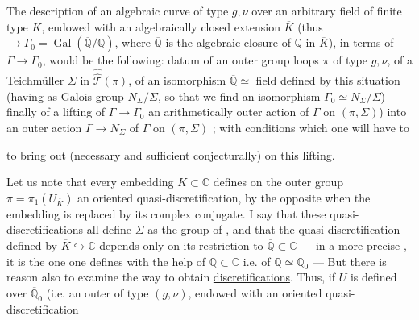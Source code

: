 The description of an  algebraic curve of type $g,\nu$ over an arbitrary  field of finite type  $K$, endowed with an algebraically closed extension $\overline K$ (thus  $\longrightarrow\Gamma_0=\operatorname{Gal}(\overline{\mathbb Q}/\mathbb Q)$, where $\overline{\mathbb Q}$ is the algebraic closure of $\mathbb Q$ in $\overline K$), in terms of $\Gamma\longrightarrow\Gamma_0$, would be the following: datum of an outer group  loops $\pi$ of type $g,\nu$, of a Teichmüller  $\Sigma$ in $\widehat{\widehat{\mathcal T}}(\pi)$, of an isomorphism $\overline{\mathbb Q}\simeq$ field defined by this situation (having as Galois group  $N_\Sigma/\Sigma$, so that we find an isomorphism $\Gamma_0\simeq N_\Sigma/\Sigma$) finally of a lifting of $\Gamma\longrightarrow\Gamma_0$   an arithmetically outer action of $\Gamma$ on $(\pi,\Sigma)$) into an outer action $\Gamma\longrightarrow N_\Sigma$ of $\Gamma$ on $(\pi,\Sigma)$ ; with conditions which one will have to 

to bring out (necessary and sufficient conjecturally) on this lifting.

Let us note that every embedding $\overline K\subset\mathbb C$
defines  on the outer group
$\pi=\pi_1(U_{\overline K})$
an oriented quasi-discretification, 
by the opposite when the embedding is replaced by its complex conjugate.
  I say that these
quasi-discretifications all define $\Sigma$ as the group of
, and that the quasi-discretification
defined by $\overline K\hookrightarrow\mathbb C$ depends only on
its restriction to
$\overline{\mathbb Q}\subset\mathbb C$
--- in a more precise , it is the one one defines
 with the help of $\overline{\mathbb Q}\subset\mathbb C$ i.e. of
$\overline{\mathbb Q}\simeq\overline{\mathbb Q}_0$
--- But there is reason also to examine the way to obtain
\uline{discretifications}. Thus, if  $U$ is defined
over $\overline{\mathbb Q}_0$ (i.e. an outer \unsure{$\pi$|$\Pi$} of type
$(g,\nu)$, endowed with an oriented quasi-discretification

